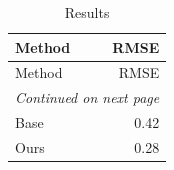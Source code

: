 \begin{longtable}{lr}
  \caption{Results}\label{tab:res} \\
  \toprule
  Method & RMSE \\
  \midrule
  \endfirsthead
  \toprule
  Method & RMSE \\
  \midrule
  \endhead
  \midrule
  \multicolumn{2}{r}{\footnotesize\emph{Continued on next page}} \\
  \endfoot
  \bottomrule
  \endlastfoot
  Base & 0.42 \\
  Ours & 0.28 \\
\end{longtable}
